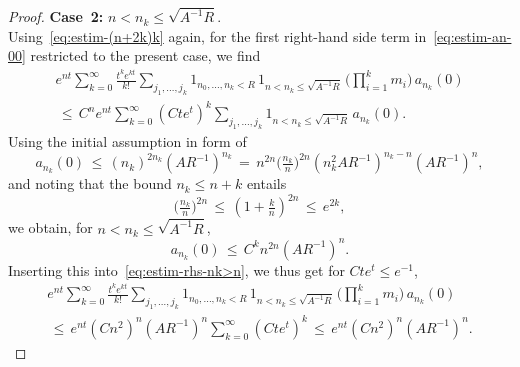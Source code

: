 \documentclass[a4paper,11pt,reqno,noindent]{amsart}
\theoremstyle{plain}
\theoremstyle{definition}
\numberwithin{equation}{section}
\begin{document}
\begin{proof}
\noindent
{\bf Case~2:} $n<n_k\le \sqrt{A^{-1}R}$.\\
Using~\eqref{eq:estim-(n+2k)k} again, for the first right-hand side term in~\eqref{eq:estim-an-00} restricted to the present case, we find
\begin{multline}\label{eq:estim-rhs-nk>n}
e^{nt}\sum_{k=0}^\infty \tfrac{t^ke^{kt}}{k!}\sum_{j_1,\ldots,j_k}1_{n_0,\ldots,n_k<R}\,1_{n<n_k\le\sqrt{A^{-1}R}}\,\Big(\prod_{i=1}^km_i\Big)\,a_{n_k}(0)\\
\,\le\,C^ne^{nt}\sum_{k=0}^\infty (Cte^{t})^k\sum_{j_1,\ldots,j_k}1_{n<n_k\le\sqrt{A^{-1}R}}\,a_{n_k}(0).
\end{multline}
Using the initial assumption in form of
\[a_{n_k}(0)\,\le\,(n_k)^{2n_k}(AR^{-1})^{n_k}
\,=\,n^{2n}\big(\tfrac{n_k}{n}\big)^{2n}(n_k^2AR^{-1})^{n_k-n}(AR^{-1})^{n},\]
and noting that the bound $n_k\le n+k$ entails
\[\big(\tfrac{n_k}n\big)^{2n}\,\le\,(1+\tfrac kn)^{2n}\,\le\,e^{2k},\]
we obtain, for $n< n_k\le\sqrt{A^{-1}R}$,
\[a_{n_k}(0)\,\le\,C^kn^{2n}(AR^{-1})^{n}.\]
Inserting this into~\eqref{eq:estim-rhs-nk>n}, we thus get for $Cte^t\le e^{-1}$,
\begin{multline*}
e^{nt}\sum_{k=0}^\infty \tfrac{t^ke^{kt}}{k!}\sum_{j_1,\ldots,j_k}1_{n_0,\ldots,n_k<R}\,1_{n<n_k\le\sqrt{A^{-1}R}}\,\Big(\prod_{i=1}^km_i\Big)\,a_{n_k}(0)\\[-2mm]
\,\le\,e^{nt}(Cn^2)^n(AR^{-1})^n\sum_{k=0}^\infty (Cte^{t})^k\,\le\,e^{nt}(Cn^2)^n(AR^{-1})^n.
\end{multline*}


\end{proof}
\end{document}
